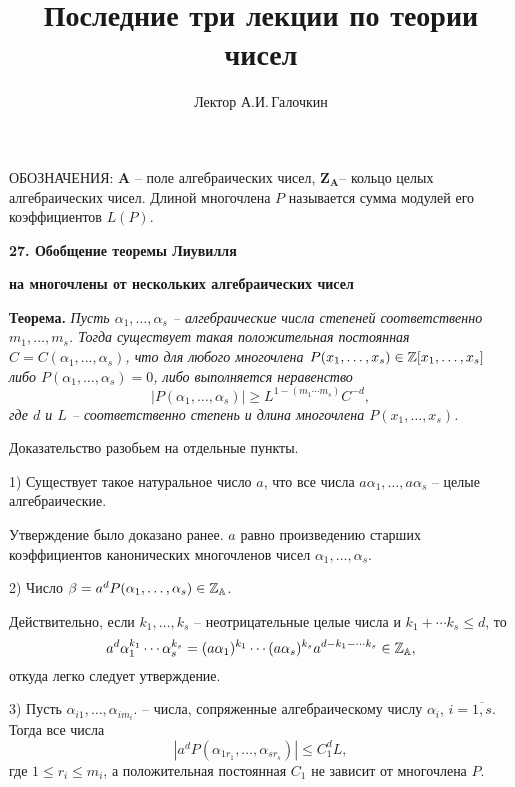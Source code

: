 \documentclass[12pt]{article}
\let\ol\overline
\begin{document}
\title{Последние три лекции по теории чисел}
\author{Лектор А.И.\,Галочкин }%
\date{}
\maketitle

ОБОЗНАЧЕНИЯ: $\mathbf A$ -- поле алгебраических чисел, $\mathbf
Z_{\mathbf A}$-- кольцо целых алгебраических чисел. Длиной
многочлена $P$ называется сумма модулей его коэффициентов $L(P)$.


\vskip 10mm \centerline{\bf {27. Обобщение теоремы Лиувилля}  }
\centerline{\bf {на многочлены от нескольких алгебраических чисел}
} \vskip 5mm


{\bf Теорема.} {\it Пусть $\alpha_1, \dots, \alpha_s$ --
алгебраические числа степеней соответственно $m_1, \dots, m_s$.
Тогда существует такая положительная постоянная $C=C(\alpha_1,
\dots, \alpha_s)$, что для любого многочлена $P(x_1, \dots, x_s)
\in \Bbb Z[x_1, \dots, x_s]$ либо $P(\alpha_1, \dots,
\alpha_s)=0$, либо выполняется неравенство
\begin{equation}\label{1}
|P(\alpha_1, \dots, \alpha_s)| \ge L^{1-(m_1 \cdots m_s)} C^{-d},
\end{equation}
 где $d$   и $L$  -- соответственно степень и длина
многочлена $P(x_1, \dots, x_s)$.}

\vskip 5mm

Доказательство разобьем на отдельные пункты. \vskip 5mm

1) Существует такое натуральное число $a$, что все числа $a
\alpha_1, \dots, a \alpha_s$ -- целые алгебраические.

Утверждение было доказано ранее. $a$ равно произведению старших
коэффициентов канонических многочленов чисел $\alpha_1, \dots,
\alpha_s$. \vskip 5mm

2) Число $\beta = a^d P(\alpha_1, \dots, \alpha_s) \in \Bbb
Z_{\Bbb A}$.

Действительно, если $k_1, \dots, k_s$ -- неотрицательные целые
числа и $k_1+ \cdots k_s \le d$, то
$$
a^d \alpha_1^{k_1} \cdots \alpha_s^{k_s} = (a \alpha_1)^{k_1}
\cdots (a \alpha_s)^{k_s}a^{d-k_1- \cdots k_s} \in \Bbb Z_{\Bbb
A},
$$
откуда легко следует утверждение. \vskip 5mm

3) Пусть $\alpha_{i1}, \dots, \alpha_{im_i}$. -- числа,
сопряженные алгебраическому числу   $\alpha_i$, $i= \ol{1,s}$.
Тогда все числа
$$
|a^dP(\alpha_{1r_1}, \dots, \alpha_{sr_s})| \le C_1^d L,
$$
где $1 \le r_i \le m_i$, а положительная постоянная  $C_1$ не
зависит от многочлена $P$. \vskip 5mm
\end{document}
